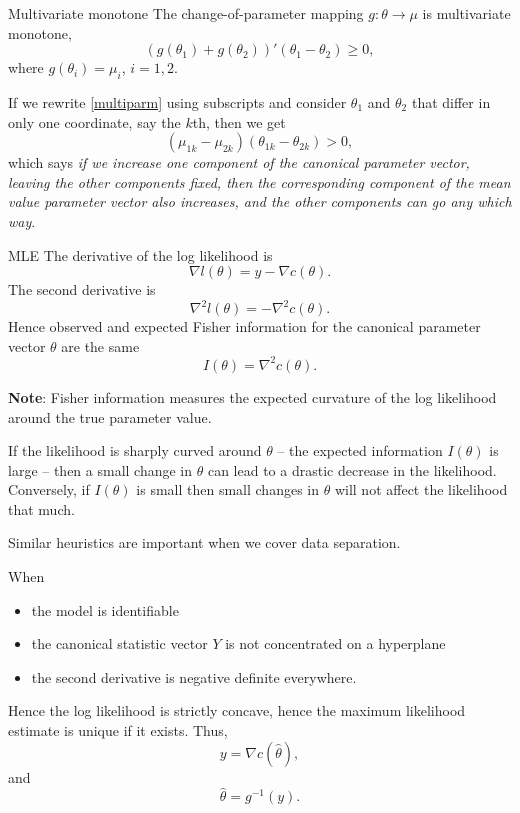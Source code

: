\documentclass[
  ignorenonframetext,
]{beamer}
\providecommand{\tightlist}{%
  \setlength{\itemsep}{0pt}\setlength{\parskip}{0pt}}
\begin{document}
\begin{frame}{Multivariate monotone}
\protect\hypertarget{multivariate-monotone}{}
The change-of-parameter mapping \(g:\theta\to\mu\) is multivariate
monotone, \begin{equation} \label{multiparm}
  (g(\theta_1) + g(\theta_2))'(\theta_1 - \theta_2) \geq 0,
\end{equation} where \(g(\theta_i) = \mu_i\), \(i = 1,2\).

If we rewrite \eqref{multiparm} using subscripts and consider
\(\theta_1\) and \(\theta_2\) that differ in only one coordinate, say
the \(k\)th, then we get \[
  (\mu_{1k} - \mu_{2k})(\theta_{1k} - \theta_{2k}) > 0,
\] which says
\emph{if we increase one component of the canonical parameter vector, leaving the other components fixed, then the corresponding component of the mean value parameter vector also increases, and the other components can go any which way}.
\end{frame}

\begin{frame}{MLE}
\protect\hypertarget{mle}{}
The derivative of the log likelihood is \[
  \nabla l(\theta) = y - \nabla c(\theta).
\] The second derivative is \[
  \nabla^2 l(\theta) = -\nabla^2 c(\theta).
\] Hence observed and expected Fisher information for the canonical
parameter vector \(\theta\) are the same \begin{equation} \label{FI}
    I(\theta) = \nabla^2 c(\theta).
\end{equation}
\end{frame}

\begin{frame}{}
\protect\hypertarget{section}{}
\textbf{Note}: Fisher information measures the expected curvature of the
log likelihood around the true parameter value.

If the likelihood is sharply curved around \(\theta\) -- the expected
information \(I(\theta)\) is large -- then a small change in \(\theta\)
can lead to a drastic decrease in the likelihood. Conversely, if
\(I(\theta)\) is small then small changes in \(\theta\) will not affect
the likelihood that much.

Similar heuristics are important when we cover data separation.
\end{frame}

\begin{frame}{}
\protect\hypertarget{section-1}{}
When

\begin{itemize}
\tightlist
\item
  the model is identifiable
\item
  the canonical statistic vector \(Y\) is not concentrated on a
  hyperplane
\item
  the second derivative is negative definite everywhere.
\end{itemize}

Hence the log likelihood is strictly concave, hence the maximum
likelihood estimate is unique if it exists. Thus, \[
  y = \nabla c(\hat{\theta}),
\] and \[
  \hat{\theta} = g^{-1}(y).
\]
\end{frame}
\end{document}
